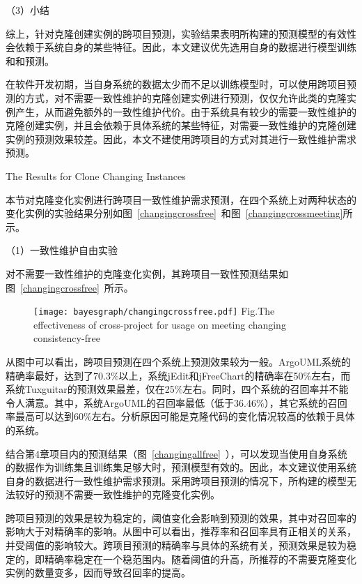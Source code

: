 （3）小结

综上，针对克隆创建实例的跨项目预测，实验结果表明所构建的预测模型的有效性会依赖于系统自身的某些特征。因此，本文建议优先选用自身的数据进行模型训练和和预测。

在软件开发初期，当自身系统的数据太少而不足以训练模型时，可以使用跨项目预测的方式，对不需要一致性维护的克隆创建实例进行预测，仅仅允许此类的克隆实例产生，从而避免额外的一致性维护代价。由于系统具有较少的需要一致性维护的克隆创建实例，并且会依赖于具体系统的某些特征，对需要一致性维护的克隆创建实例的预测效果较差。因此，本文不建使用跨项目的方式对其进行一致性维护需求预测。

{The Results for Clone Changing Instances}

本节对克隆变化实例进行跨项目一致性维护需求预测，在四个系统上对两种状态的变化实例的实验结果分别如图~\ref{changingcrossfree}~和图~\ref{changingcrossmeeting}所示。

（1）一致性维护自由实验

对不需要一致性维护的克隆变化实例，其跨项目一致性预测结果如图~\ref{changingcrossfree}~所示。

\begin{figure}[h]
\centering
\texttt{[image: bayesgraph/changingcrossfree.pdf]}
{Fig.$\!$}{The effectiveness of cross-project for usage on meeting changing consistency-free}
\vspace{-1em}
\end{figure}

从图中可以看出，跨项目预测在四个系统上预测效果较为一般。ArgoUML系统的精确率最好，达到了70.3\%以上，系统jEdit和jFreeChart的精确率在50\%左右，而系统Tuxguitar的预测效果最差，仅在25\%左右。同时，四个系统的召回率并不能令人满意。其中，系统ArgoUML的召回率最低（低于36.46\%），其它系统的召回率最高可以达到60\%左右。分析原因可能是克隆代码的变化情况较高的依赖于具体的系统。

结合第4章项目内的预测结果（图~\ref{changingallfree}~），可以发现当使用自身系统的数据作为训练集且训练集足够大时，预测模型有效的。因此，本文建议使用系统自身的数据进行一致性维护需求预测。采用跨项目预测的情况下，所构建的模型无法较好的预测不需要一致性维护的克隆变化实例。

跨项目预测的效果是较为稳定的，阈值变化会影响到预测的效果，其中对召回率的影响大于对精确率的影响。从图中可以看出，推荐率和召回率具有正相关的关系，并受阈值的影响较大。跨项目预测的精确率与具体的系统有关，预测效果是较为稳定的，即精确率稳定在一个稳范围内。随着阈值的升高，所推荐的不需要克隆变化实例的数量变多，因而导致召回率的提高。

